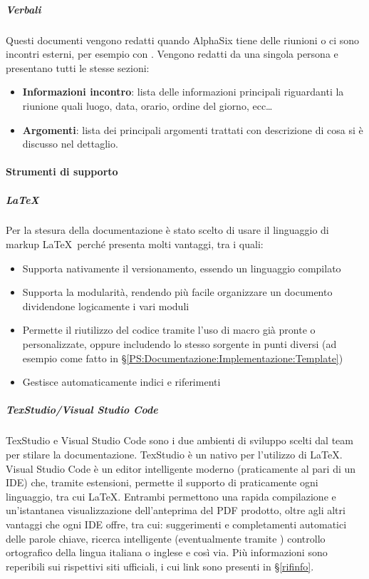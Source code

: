 

			\subparagraph{Verbali}
			Questi documenti vengono redatti quando AlphaSix tiene delle riunioni o ci sono incontri esterni, per esempio con \II. Vengono redatti da una singola persona
			e presentano tutti le stesse sezioni:
			\begin{itemize}
				\item \textbf{Informazioni incontro}: lista delle informazioni principali riguardanti la riunione quali luogo, data, orario, ordine del giorno, ecc\dots
				\item \textbf{Argomenti}: lista dei principali argomenti trattati con descrizione di cosa si è discusso nel dettaglio.
			\end{itemize}


			\paragraph{Strumenti di supporto}

			\subparagraph{\LaTeX} \label{LaTeX}
			Per la stesura della documentazione è stato scelto di usare il linguaggio di markup \LaTeX \ perché presenta molti vantaggi, tra i quali:
			\begin{itemize}
				\item Supporta nativamente il versionamento, essendo un linguaggio compilato
				\item Supporta la modularità, rendendo più facile organizzare un documento dividendone logicamente i vari moduli
				\item Permette il riutilizzo del codice tramite l'uso di macro già pronte o personalizzate, oppure includendo lo stesso sorgente in punti diversi
					(ad esempio come fatto in \S\ref{PS:Documentazione:Implementazione:Template})
				\item Gestisce automaticamente indici e riferimenti
			\end{itemize}

			\subparagraph{TexStudio/Visual Studio Code}
			TexStudio e Visual Studio Code sono i due ambienti di sviluppo scelti dal team per stilare la documentazione.
			TexStudio è un  nativo per l'utilizzo di \LaTeX. Visual Studio Code è un editor intelligente moderno (praticamente al pari di un IDE) che, tramite
			estensioni, permette il supporto di praticamente ogni linguaggio, tra cui \LaTeX.
			Entrambi permettono una rapida compilazione e un'istantanea visualizzazione dell'anteprima del PDF prodotto, oltre agli altri vantaggi che ogni IDE offre,
			tra cui: suggerimenti e completamenti automatici delle parole chiave, ricerca intelligente (eventualmente tramite ) controllo ortografico della
			lingua italiana o inglese e così via. Più informazioni sono reperibili sui rispettivi siti ufficiali, i cui link sono presenti in \S\ref{rifinfo}.

